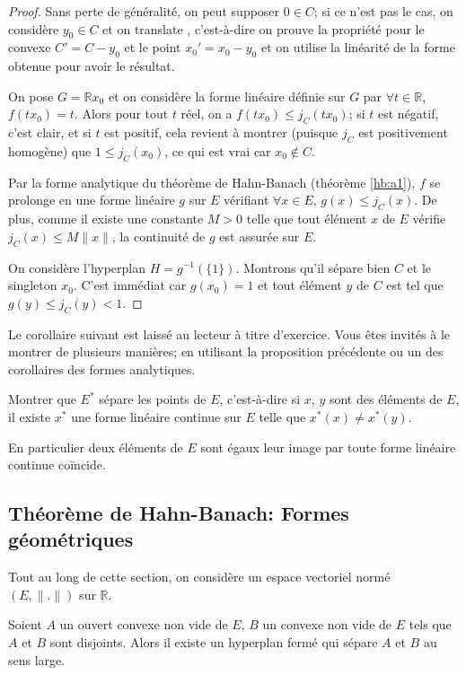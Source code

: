 \begin{proof}
Sans perte de généralité, on peut supposer $0\in C$; si ce n'est pas le cas,
on considère $y_0\in C$ et \og on translate \fg, c'est-à-dire on prouve la
propriété pour le convexe $C' = C - y_0$ et le point $x_0' = x_0 - y_0$ et on utilise
la linéarité de la forme obtenue pour avoir le résultat.

On pose $G = \mathbb{R}x_0$ et on considère la forme linéaire définie sur $G$
par $\forall t\in \mathbb{R}$, $f(tx_0) = t$. Alors pour tout $t$ réel, on a
$f(tx_0)\leq j_C(tx_0)$; si $t$ est négatif, c'est clair, et si $t$ est positif,
cela revient à montrer (puisque $j_C$ est positivement homogène)
que $1\leq j_C(x_0)$, ce qui est vrai car $x_0\notin C$.

Par la forme analytique du théorème de Hahn-Banach (théorème \ref{hb:a1}),
$f$ se prolonge en une forme linéaire $g$ sur $E$ vérifiant $\forall x \in E$,
$g(x)\leq j_C(x)$.
De plus, comme il existe une constante $M >0$ telle que tout élément
$x$ de $E$ vérifie $j_C(x) \leq M\|x\|$, la continuité de $g$ est assurée
sur $E$.

On considère l'hyperplan $H = g^{-1}(\{1\})$. Montrons qu'il sépare bien $C$ et
le singleton $x_0$. C'est immédiat car $g(x_0) = 1$ et tout élément $y$ de $C$
est tel que $g(y)\leq j_C(y) < 1$.
\end{proof}

Le corollaire suivant est laissé au lecteur à titre d'exercice. Vous êtes
invités à le montrer de plusieurs manières; en utilisant la proposition
précédente ou un des corollaires des formes analytiques.

\begin{exo}
  Montrer que $E^*$ sépare les points de $E$, c'est-à-dire si $x$, $y$
  sont des éléments de $E$, il existe $x^*$ une forme linéaire continue
  sur $E$ telle que $x^*(x)\neq x^*(y)$.
\end{exo}

En particulier deux éléments de $E$ sont égaux \ssi{} leur image
par toute forme linéaire continue coïncide.

\subsection{Théorème de Hahn-Banach: Formes géométriques}
Tout au long de cette section, on considère un espace vectoriel normé
$(E, \|.\|)$ sur $\mathbb{R}$.
\begin{thm} \label{hb:g1}
  Soient $A$ un ouvert convexe non vide de $E$, $B$ un convexe non vide
  de $E$ tels que $A$ et $B$ sont disjoints. Alors il existe un hyperplan
  fermé qui sépare $A$ et $B$ au sens large.
\end{thm}


